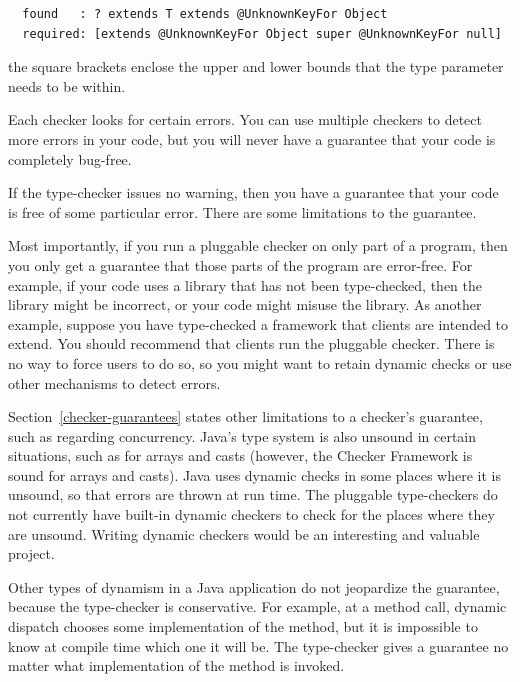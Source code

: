 \begin{Verbatim}
  found   : ? extends T extends @UnknownKeyFor Object
  required: [extends @UnknownKeyFor Object super @UnknownKeyFor null]
\end{Verbatim}

\noindent
the square brackets enclose the upper and lower bounds that the type parameter needs to be within.



Each checker looks for certain errors.  You can use multiple checkers to
detect more errors in your code, but you will never have a guarantee that
your code is completely bug-free.

If the type-checker issues no warning, then you have a guarantee that your
code is free of some particular error.  There are some limitations to the
guarantee.

Most importantly, if you run a pluggable checker on only part of a program, then
you only get a guarantee that those parts of the program are error-free.
For example, if your code uses a library that has not been type-checked,
then the library might be incorrect, or your code might misuse the library.
As another example, suppose you have type-checked a framework that clients
are intended to extend.  You should recommend that clients
run the pluggable checker.  There is no way to force users to do so, so you
might want to retain dynamic checks or use other mechanisms to detect errors.

Section~\ref{checker-guarantees} states other limitations to a checker's
guarantee, such as regarding concurrency.  Java's type system is also
unsound in certain situations, such as for arrays and casts (however, the
Checker Framework is sound for arrays and casts).  Java uses dynamic checks
in some places where it is unsound, so that errors are thrown at run time.  The
pluggable type-checkers do not currently have built-in dynamic checkers to
check for the places where they are unsound.
Writing dynamic checkers would be an interesting and valuable project.

Other types of dynamism in a Java application do not jeopardize the
guarantee, because the type-checker is conservative.  For example, at a
method call, dynamic dispatch chooses some implementation of the method,
but it is impossible to know at compile time which one it will be.  The
type-checker gives a guarantee no matter what implementation of the method
is invoked.

